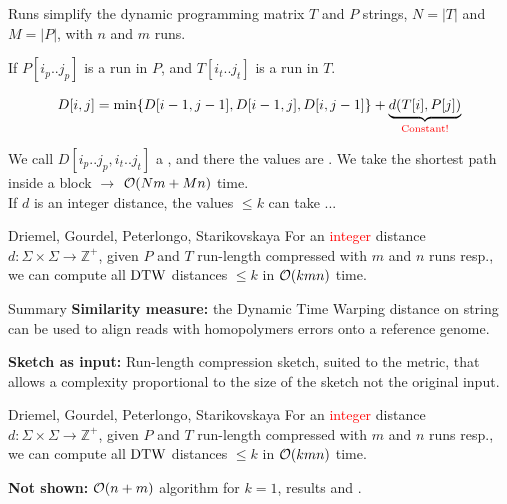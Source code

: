 \begin{frame}{Runs simplify the dynamic programming matrix}
    $T$ and $P$ strings, $N=|T|$ and $M=|P|$, with $n$ and $m$ runs. \pause
    \smallskip

    If $P[i_p.. j_p]$ is a run in $P$, and $T[i_t .. j_t]$ is a run in $T$.\pause
    
    
    {
    \[
        D[i,j] = {\min\{D[i-1,j-1],D[i-1,j],D[i,j-1]\}
        + \underbrace{d(T[i], P[j])}_\text{\textcolor{red}{Constant!}}}
    \]
    }

    \pause       
    We call $D[i_p .. j_p, i_t .. j_t]$ a , and there the values are . \pause
    We take the shortest path inside a block $\rightarrow$ $\mathcal{O}(Nm+Mn)$ time.\\ \pause
    If $d$ is an integer distance, the values $\leq k$ can take ... \pause
    
    \begin{myalertblock}{Driemel, Gourdel, Peterlongo, Starikovskaya}
        For an \textcolor{red}{integer} distance $d: \Sigma \times \Sigma \rightarrow \mathbb{Z}^+$, given $P$ and $T$ run-length compressed with $m$ and $n$ runs resp.,
        we can compute all $\mathrm{DTW}$ distances $\leq k$ in $\mathcal{O}(k mn)$ time.
    \end{myalertblock}
    \end{frame}

\begin{frame}{Summary}
    \textbf{Similarity measure:} the Dynamic Time Warping distance on string can be used to align reads with homopolymers errors onto a reference genome.

    \vfill
    
    \textbf{Sketch as input:} Run-length compression sketch, suited to the metric, that allows a complexity proportional to the size of the sketch not the original input.
    
    \vfill
    \begin{myalertblock}{Driemel, Gourdel, Peterlongo, Starikovskaya}
        For an \textcolor{red}{integer} distance $d: \Sigma \times \Sigma \rightarrow \mathbb{Z}^+$, given $P$ and $T$ run-length compressed with $m$ and $n$ runs resp.,
        we can compute all $\mathrm{DTW}$ distances $\leq k$ in $\mathcal{O}(k mn)$ time.
    \end{myalertblock}
    \vfill
    \textbf{Not shown:} $\mathcal{O}(n+m)$ algorithm for $k=1$,   results and .
\end{frame}
    